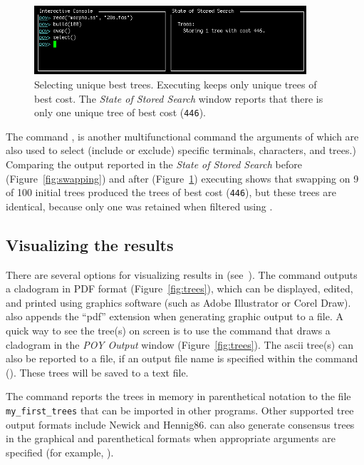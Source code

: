 {\begin{figure}[]
    \begin{center}
        \includegraphics[width=0.9\textwidth]{doc/figures/select.jpg}
    \end{center}
    \caption{Selecting unique best trees. Executing  keeps only unique trees of best cost. The 
    \emph{State of Stored Search} window reports that there is only one unique tree of best cost (\texttt{446}).}
    \label{fig:select}
\end{figure}

The command , is another multifunctional command the arguments of which are also used to 
select (include or exclude) specific terminals, characters, and trees.) Comparing the output reported in the 
\emph{State of Stored Search} before (Figure~\ref{fig:swapping}) and after (Figure~\ref{fig:select}) executing 
 shows that swapping on 9 of 100 initial trees produced the trees of best cost (\texttt{446}), 
but these trees are identical, because only one was retained when filtered using .

\subsection{Visualizing the results}

There are several options for visualizing results in \poy (see~). The command
 outputs a cladogram in PDF format (Figure~\ref{fig:trees}), 
which can be displayed, edited, and printed using graphics software (such as Adobe Illustrator or Corel Draw). 
\poy also appends the ``pdf'' extension when generating graphic output to a file. A quick way to see the tree(s) on screen 
is to use the command  that draws a cladogram in the \emph{POY Output} window 
(Figure~\ref{fig:trees}). The ascii tree(s) can also be reported to a file, if an output file name is specified within the 
command ().  These trees will be saved to a text file.

The command  reports the trees in memory in parenthetical 
notation to the file \texttt{my\_first\_trees} that can be imported in other programs. Other supported tree output 
formats include Newick and Hennig86.  can also generate consensus trees in the graphical 
and parenthetical formats when appropriate arguments are specified (for example, ).

}

